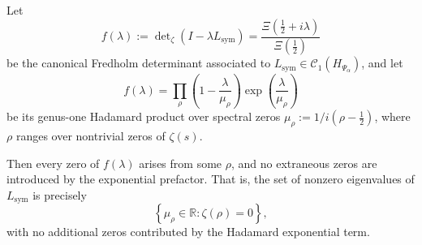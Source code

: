 \begin{lemma}
\label{lem:no-extraneous-zeros}
Let
\[
f(\lambda) := \det\nolimits_\zeta(I - \lambda L_{\mathrm{sym}}) = \frac{\Xi(\tfrac{1}{2} + i\lambda)}{\Xi(\tfrac{1}{2})}
\]
be the canonical Fredholm determinant associated to \( L_{\mathrm{sym}} \in \mathcal{C}_1(H_{\Psi_\alpha}) \), and let
\[
f(\lambda) = \prod_{\rho} \left(1 - \frac{\lambda}{\mu_\rho} \right) \exp\left( \frac{\lambda}{\mu_\rho} \right)
\]
be its genus-one Hadamard product over spectral zeros \( \mu_\rho := 1 / i(\rho - \tfrac{1}{2}) \), where \( \rho \) ranges over nontrivial zeros of \( \zeta(s) \).

Then every zero of \( f(\lambda) \) arises from some \( \rho \), and no extraneous zeros are introduced by the exponential prefactor. That is, the set of nonzero eigenvalues of \( L_{\mathrm{sym}} \) is precisely
\[
\left\{ \mu_\rho \in \mathbb{R} : \zeta(\rho) = 0 \right\},
\]
with no additional zeros contributed by the Hadamard exponential term.

\end{lemma}
% 